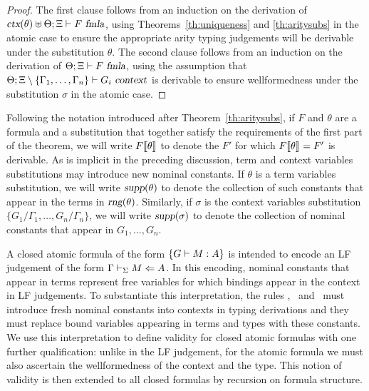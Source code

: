 \begin{proof}
The first clause follows from an induction on the derivation of 
$\mbox{\sl ctx}(\theta) \uplus \Theta;\Xi \vdash F\ \mbox{\sl fmla}$, using  
Theorems~\ref{th:uniqueness} and \ref{th:aritysubs} in the atomic case
to ensure the appropriate arity typing judgements will be derivable under 
the substitution $\theta$.
%
The second clause follows from an induction on the derivation of
$\Theta;\Xi \vdash F\ \mbox{\sl fmla}$, using the assumption that
$\Theta;\Xi\setminus\{\Gamma_1,\ldots,\Gamma_n\} \vdash G_i\ \mbox{\sl context}$
is derivable to ensure wellformedness under the substitution $\sigma$
in the atomic case.
\end{proof}

\noindent Following the notation introduced after Theorem~\ref{th:aritysubs}, 
if $F$ and $\theta$ are a formula and a substitution that together satisfy
the requirements of the first part of the theorem, we will write
$F\llbracket {\theta} \rrbracket$ to denote the $F'$ for which 
$F\llbracket {\theta} \rrbracket_{} = F'$ is derivable.
%
As is implicit in the preceding discussion, term and context variables
substitutions may introduce new nominal constants. 
%
If $\theta$ is a term variables substitution, we will write
$\mbox{\sl supp}(\theta)$ to denote the collection of such constants that
appear in the terms in $\mbox{\sl rng}(\theta)$.
%
Similarly, if $\sigma$ is the context variables substitution
$\{G_1/\Gamma_1,\ldots,G_n/\Gamma_n\}$, 
we will write $\mbox{\sl supp}(\sigma)$ to denote the collection of nominal
constants that appear in $G_1,\ldots,G_n$.

A closed atomic formula of the form
$\left\{G \vdash M:A\right\}$ is intended to encode an LF judgement of the
form $\Gamma \vdash_{\Sigma} M\Leftarrow A$.
%
In this encoding, nominal constants that appear in terms represent
free variables for which bindings appear in the context in LF
judgements.
%
To substantiate this interpretation, the rules \canonkindpi, \canonfampi\ and
\canontermlam\ must introduce fresh nominal constants into contexts in
typing derivations and they must replace bound variables appearing in
terms and types with these constants. 
%
We use this interpretation to define validity for closed atomic
formulas with one further qualification: unlike in the LF judgement,
for the atomic formula we must also ascertain the wellformedness of
the context and the type.
%
This notion of validity is then extended to all closed formulas by
recursion on formula structure.

